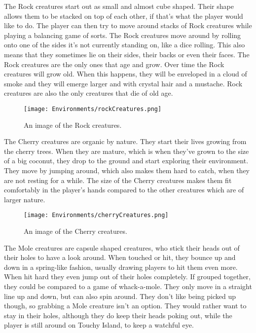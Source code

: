 The Rock creatures start out as small and almost cube shaped. Their shape allows them to be stacked on top of each other, if that's what the player would like to do. The player can then try to move around stacks of Rock creatures while playing a balancing game of sorts. The Rock creatures move around by rolling onto one of the sides it's not currently standing on, like a dice rolling. This also means that they sometimes lie on their sides, their backs or even their faces. The Rock creatures are the only ones that age and grow. Over time the Rock creatures will grow old. When this happens, they will be enveloped in a cloud of smoke and they will emerge larger and with crystal hair and a mustache. Rock creatures are also the only creatures that die of old age.

\begin{figure}[h]
\centering
\texttt{[image: Environments/rockCreatures.png]}
\caption{An image of the Rock creatures.}
\label{fig:rockCreatures}
\end{figure}

The Cherry creatures are organic by nature. They start their lives growing from the cherry trees. When they are mature, which is when they've grown to the size of a big coconut, they drop to the ground and start exploring their environment. They move by jumping around, which also makes them hard to catch, when they are not resting for a while. The size of the Cherry creatures makes them fit comfortably in the player's hands compared to the other creatures which are of larger nature.

\begin{figure}[h]
\centering
\texttt{[image: Environments/cherryCreatures.png]}
\caption{An image of the Cherry creatures.}
\label{fig:cherryCreatures}
\end{figure}

The Mole creatures are capsule shaped creatures, who stick their heads out of their holes to have a look around. When touched or hit, they bounce up and down in a spring-like fashion, usually drawing players to hit them even more. When hit hard they even jump out of their holes completely. If grouped together, they could be compared to a game of whack-a-mole.  They only move in a straight line up and down, but can also spin around. They don't like being picked up though, so grabbing a Mole creature isn't an option. They would rather want to stay in their holes, although they do keep their heads poking out, while the player is still around on Touchy Island, to keep a watchful eye.


